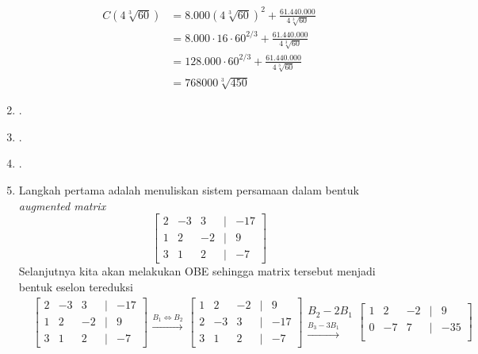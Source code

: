 \documentclass[11pt,openany,a4paper]{article}
\begin{document}
\begin{enumerate}
        \begin{align*}
            C(4\sqrt[3]{60}) &= 8.000(4\sqrt[3]{60})^2 + \frac{61.440.000}{4\sqrt[3]{60}} \\
            &= 8.000\cdot 16\cdot 60^{2/3} + \frac{61.440.000}{4\sqrt[3]{60}} \\
            &= 128.000\cdot 60^{2/3} + \frac{61.440.000}{4\sqrt[3]{60}} \\
            &= \boxed{768000\sqrt[3]{450}}
        \end{align*}
        \item .
        \item .
        \item .
        \item Langkah pertama adalah menuliskan sistem persamaan dalam bentuk \textit{augmented matrix} 
        \[
        \begin{bmatrix}
            2 & -3 & 3 & | & -17 \\
            1 & 2 & -2 & | & 9 \\
            3 & 1 & 2 & | & -7
        \end{bmatrix}
        \]
        Selanjutnya kita akan melakukan OBE sehingga matrix tersebut menjadi bentuk eselon tereduksi
        \begin{align*}
          &\begin{bmatrix}
              2 & -3 & 3 & | & -17 \\
              1 & 2 & -2 & | & 9 \\
              3 & 1 & 2 & | & -7
          \end{bmatrix}
          \begin{matrix}
              \xrightarrow{B_1 \Leftrightarrow B_2} 
          \end{matrix}
          \begin{bmatrix}
              1 & 2 & -2 & | & 9 \\
              2 & -3 & 3 & | & -17 \\
              3 & 1 & 2 & | & -7
          \end{bmatrix}
          \begin{matrix}
              {\scriptstyle B_2 - 2B_1}\\
              \xrightarrow{B_3-3B_1}
          \end{matrix}
          \begin{bmatrix}
              1 & 2 & -2 & | & 9 \\
              0 & -7 & 7 & | & -35 \\

\end{bmatrix}
\end{align*}
\end{enumerate}
\end{document}
